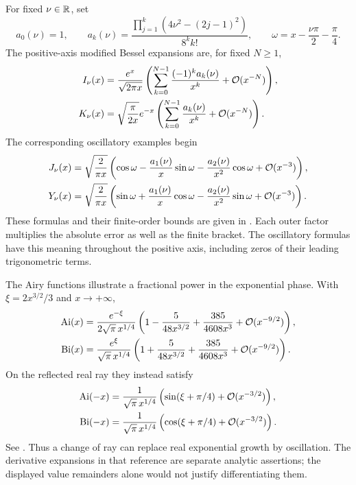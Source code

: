 For fixed $\nu\in\mathbb R$, set
\[
 a_0(\nu)=1,\qquad
 a_k(\nu)=\frac{\prod_{j=1}^k(4\nu^2-(2j-1)^2)}{8^k k!},
 \qquad \omega=x-\frac{\nu\pi}{2}-\frac{\pi}{4}.
\]
The positive-axis modified Bessel expansions are, for fixed $N\ge1$,
\begin{equation}
\begin{aligned}
 I_\nu(x)
 &=\frac{e^x}{\sqrt{2\pi x}}
   \left(\sum_{k=0}^{N-1}\frac{(-1)^ka_k(\nu)}{x^k}
         +\mathcal O(x^{-N})\right),\\
 K_\nu(x)
 &=\sqrt{\frac{\pi}{2x}}e^{-x}
   \left(\sum_{k=0}^{N-1}\frac{a_k(\nu)}{x^k}
         +\mathcal O(x^{-N})\right).
\end{aligned}
\label{eq:special-function-modified-bessel}
\end{equation}
The corresponding oscillatory examples begin
\begin{equation}
\begin{aligned}
 J_\nu(x)&=\sqrt{\frac{2}{\pi x}}
   \left(\cos\omega-\frac{a_1(\nu)}x\sin\omega
       -\frac{a_2(\nu)}{x^2}\cos\omega+\mathcal O(x^{-3})\right),\\
 Y_\nu(x)&=\sqrt{\frac{2}{\pi x}}
   \left(\sin\omega+\frac{a_1(\nu)}x\cos\omega
       -\frac{a_2(\nu)}{x^2}\sin\omega+\mathcal O(x^{-3})\right).
\end{aligned}
\label{eq:special-function-oscillatory-bessel}
\end{equation}
These formulas and their finite-order bounds are given in
\cite[\S\S10.17, 10.40]{dlmf}. Each outer factor multiplies the
absolute error as well as the finite bracket. The oscillatory formulas
have this meaning throughout the positive axis, including zeros of
their leading trigonometric terms.

The Airy functions illustrate a fractional power in the exponential
phase. With $\xi=2x^{3/2}/3$ and $x\to+\infty$,
\begin{equation}
\begin{aligned}
 \operatorname{Ai}(x)
 &=\frac{e^{-\xi}}{2\sqrt{\pi}\,x^{1/4}}
   \left(1-\frac5{48x^{3/2}}+\frac{385}{4608x^3}
              +\mathcal O(x^{-9/2})\right),\\
 \operatorname{Bi}(x)
 &=\frac{e^\xi}{\sqrt{\pi}\,x^{1/4}}
   \left(1+\frac5{48x^{3/2}}+\frac{385}{4608x^3}
              +\mathcal O(x^{-9/2})\right).
\end{aligned}
\label{eq:special-function-airy-positive}
\end{equation}
On the reflected real ray they instead satisfy
\begin{equation}
\begin{aligned}
 \operatorname{Ai}(-x)&=\frac1{\sqrt{\pi}\,x^{1/4}}
        \left(\sin(\xi+\pi/4)+\mathcal O(x^{-3/2})\right),\\
 \operatorname{Bi}(-x)&=\frac1{\sqrt{\pi}\,x^{1/4}}
        \left(\cos(\xi+\pi/4)+\mathcal O(x^{-3/2})\right).
\end{aligned}
\label{eq:special-function-airy-negative}
\end{equation}
See \cite[\S9.7]{dlmf}. Thus a change of ray can replace real
exponential growth by oscillation. The derivative expansions in that
reference are separate analytic assertions; the displayed value
remainders alone would not justify differentiating them.

